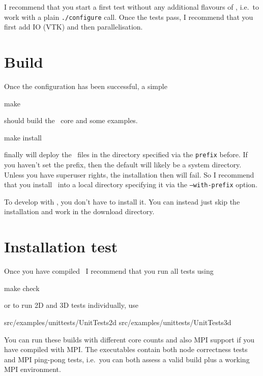 \begin{remark}
 I recommend that you start a first test without any additional flavours of
 \Peano, i.e.~to work with a plain \texttt{./configure} call. Once the tests
 pass, I recommend that you first add IO (VTK) and then parallelisation.
\end{remark}

\section{Build}

Once the configuration has been successful, a simple 
\begin{code}
make
\end{code}
should build the \Peano\ core and some examples.


\begin{code}
make install
\end{code}
finally will deploy the \Peano\ files in the directory specified via the
\texttt{prefix} before.
If you haven't set the prefix, then the default will likely be a system
directory.
Unless you have superuser rights, the installation then will fail.
So I recommend that you install \Peano\ into a local directory specifying it via
the \texttt{--with-prefix} option.


\begin{remark}
 To develop with \Peano, you don't have to install it. You can instead just skip
 the installation and work in the download directory.
\end{remark}




\section{Installation test}

Once you have compiled \Peano\, I recommend that you run all tests using

\begin{code}
  make check
\end{code}
or to run 2D and 3D tests individually, use

\begin{code}
  src/examples/unittests/UnitTests2d
  src/examples/unittests/UnitTests3d
\end{code}

\noindent
You can run these builds with different core counts and also MPI support if you
have compiled with MPI.
The executables contain both node correctness tests and MPI ping-pong tests,
i.e.~you can both assess a valid build plus a working MPI environment.



